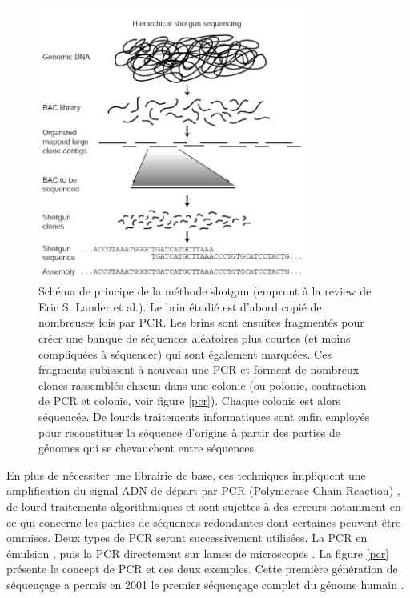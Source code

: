 \begin{figure}[H]
\begin{center}
\includegraphics[width=0.8\textwidth]{shotgun.jpeg}
\vspace{0.5cm}

\caption[Méthode Shotgun]{Schéma de principe de la méthode shotgun (emprunt à la review de Eric S. Lander et al.\cite{Lander2001}). Le brin étudié est d'abord copié de nombreuses fois par PCR. Les brins sont ensuites fragmentés pour créer une banque de séquences aléatoires plus courtes (et moins compliquées à séquencer) qui sont également marquées. Ces fragments subissent à nouveau une PCR et forment de nombreux clones rassemblés chacun dans une colonie (ou polonie, contraction de PCR et colonie, voir figure \ref{pcr}). Chaque colonie est alors séquencée. De lourds traitements informatiques sont enfin employés pour reconstituer la séquence d'origine à partir des parties de génomes qui se chevauchent entre séquences.}
\label{shotgun}
\end{center}
\end{figure}

 En plus de nécessiter une librairie de base, ces techniques impliquent une amplification du signal ADN de départ par PCR (Polymerase Chain Reaction) \cite{Saiki1985}, de lourd traitements algorithmiques et sont sujettes à des erreurs notamment en ce qui concerne les parties de séquences redondantes dont certaines peuvent être ommises. Deux types de PCR seront successivement utilisées. La PCR en émulsion \cite{Williams2006}, puis la PCR directement sur lames de microscopes \cite{Shendure2005}. La figure \ref{pcr} présente le concept de PCR et ces deux exemples. Cette première génération de séquençage a permis en 2001 le premier séquençage complet du génome humain \cite{Lander2001,Venter2001}.





